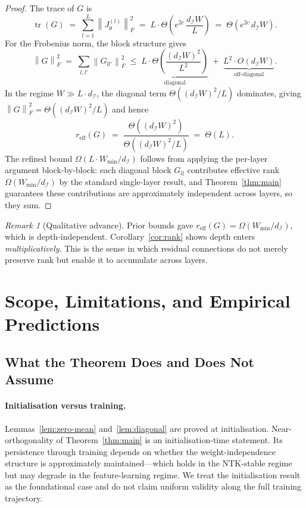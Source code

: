 \documentclass[11pt]{article}
\theoremstyle{plain}
\theoremstyle{definition}
\theoremstyle{remark}
\newtheorem{remark}[theorem]{Remark}
\newcommand{\norm}[1]{\left\|#1\right\|}
\newcommand{\tr}{\operatorname{tr}}
\newcommand{\reff}{r_{\mathrm{eff}}}
\newcommand{\dI}{d_{\mathcal{I}}}
\begin{document}
\begin{proof}
The trace of $G$ is
\[
  \tr(G)
  \;=\;
  \sum_{l=1}^L \norm{J_\theta^{(l)}}_F^2
  \;=\;
  L\cdot\Theta\!\left(e^{2c}\,\frac{\dI W}{L}\right)
  \;=\;
  \Theta\!\left(e^{2c}\,\dI W\right).
\]
For the Frobenius norm, the block structure gives
\[
  \norm{G}_F^2
  \;=\;
  \sum_{l,l'}\norm{G_{ll'}}_F^2
  \;\leq\;
  \underbrace{L\cdot\Theta\!\left(\frac{(\dI W)^2}{L^2}\right)}_{\text{diagonal}}
  \;+\;
  \underbrace{L^2\cdot O(\dI W)}_{\text{off-diagonal}}.
\]
In the regime $W\gg L\cdot\dI$, the diagonal term
$\Theta\!\left((\dI W)^2/L\right)$ dominates, giving
$\norm{G}_F^2=\Theta\!\left((\dI W)^2/L\right)$ and hence
\[
  \reff(G)
  \;=\;
  \frac{\Theta\!\left((\dI W)^2\right)}{\Theta\!\left((\dI W)^2/L\right)}
  \;=\;
  \Theta(L).
\]
The refined bound $\Omega(L\cdot W_{\min}/\dI)$ follows from applying the
per-layer argument block-by-block: each diagonal block $G_{ll}$ contributes
effective rank $\Omega(W_{\min}/\dI)$ by the standard single-layer result,
and Theorem~\ref{thm:main} guarantees these contributions are approximately
independent across layers, so they sum.
\end{proof}

\begin{remark}[Qualitative advance]
Prior bounds gave $\reff(G)=\Omega(W_{\min}/\dI)$, which is
depth-independent.  Corollary~\ref{cor:rank} shows depth enters
\emph{multiplicatively}.  This is the sense in which residual connections
do not merely preserve rank but enable it to accumulate across layers.
\end{remark}

\section{Scope, Limitations, and Empirical Predictions}
\label{sec:scope}

\subsection{What the Theorem Does and Does Not Assume}

\paragraph{Initialisation versus training.}
Lemmas~\ref{lem:zero-mean} and~\ref{lem:diagonal} are proved at
initialisation.  Near-orthogonality of Theorem~\ref{thm:main} is an
initialisation-time statement.  Its persistence through training depends on
whether the weight-independence structure is approximately maintained---which
holds in the NTK-stable regime \citep{jacot2018} but may degrade in the
feature-learning regime.  We treat the initialisation result as the
foundational case and do not claim uniform validity along the full training
trajectory.
\end{document}
